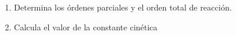 \begin{exercise}

    \begin{enumerate}[label=\letraminuscula]
        \item Determina los órdenes parciales y el orden total de reacción.
        \item Calcula el valor de la constante cinética
    \end{enumerate}

    \begin{solu}

    \end{solu}

\end{exercise}

